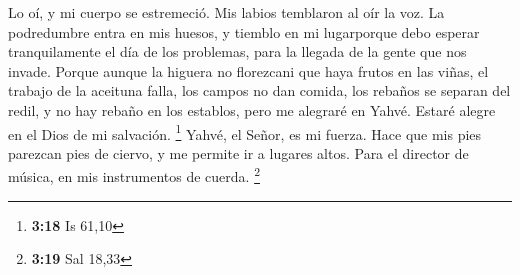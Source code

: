  Lo oí, y mi cuerpo se estremeció. Mis labios temblaron
al oír la voz. La podredumbre entra en mis huesos, y tiemblo en mi
lugarporque debo esperar tranquilamente el día de los problemas, para la
llegada de la gente que nos invade.  Porque aunque la
higuera no florezcani que haya frutos en las viñas, el trabajo de la
aceituna falla, los campos no dan comida, los rebaños se separan del
redil, y no hay rebaño en los establos,  pero me alegraré
en Yahvé. Estaré alegre en el Dios de mi salvación. \footnote{\textbf{3:18}
  Is 61,10}  Yahvé, el Señor, es mi fuerza. Hace que mis
pies parezcan pies de ciervo, y me permite ir a lugares altos. Para el
director de música, en mis instrumentos de cuerda. \footnote{\textbf{3:19}
  Sal 18,33}
